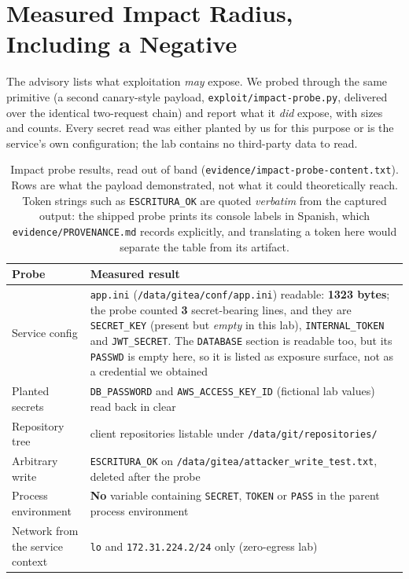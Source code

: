 \documentclass[journal]{IEEEtran}
\begin{document}
\section{Measured Impact Radius, Including a Negative}
\label{sec:impact}

The advisory lists what exploitation \emph{may} expose. We probed through the
same primitive (a second canary-style payload, \texttt{exploit/impact-probe.py},
delivered over the identical two-request chain) and report what it \emph{did}
expose, with sizes and counts. Every secret read was either planted by us for
this purpose or is the service's own configuration; the lab contains no
third-party data to read.

\begin{table}[t]
\centering
\footnotesize
\begin{tabular}{@{}p{2.2cm}p{5.4cm}@{}}
\toprule
Probe & Measured result \\
\midrule
Service config & \texttt{app.ini}
(\texttt{\allowbreak /data/\allowbreak gitea/\allowbreak conf/app.ini}) readable: \textbf{1323 bytes}; the
probe counted \textbf{3} secret-bearing lines, and they are \texttt{SECRET\_KEY}
(present but \emph{empty} in this lab), \texttt{INTERNAL\_TOKEN} and
\texttt{JWT\_SECRET}. The \texttt{DATABASE} section is readable too, but its
\texttt{PASSWD} is empty here, so it is listed as exposure surface, not as a
credential we obtained \\
Planted secrets & \texttt{DB\_PASSWORD} and \texttt{AWS\_ACCESS\_KEY\_ID}
(fictional lab values) read back in clear \\
Repository tree & client repositories listable under
\texttt{/data/git/repositories/} \\
Arbitrary write & \texttt{ESCRITURA\_OK} on
\texttt{\allowbreak /data/\allowbreak gitea/\allowbreak attacker\_write\_\allowbreak test.txt}, deleted after the probe \\
Process environment & \textbf{No} variable containing
\texttt{SECRET}, \texttt{TOKEN} or \texttt{PASS} in the parent process
environment \\
Network from the service context & \texttt{lo} and \texttt{172.31.224.2/24}
only (zero-egress lab) \\
\bottomrule
\end{tabular}
\caption{Impact probe results, read out of band
(\texttt{evidence/impact-probe-content.txt}). Rows are what the payload
demonstrated, not what it could theoretically reach. Token strings such as
\texttt{ESCRITURA\_OK} are quoted \emph{verbatim} from the captured output: the shipped
probe prints its console labels in Spanish, which \texttt{evidence/PROVENANCE.md} records
explicitly, and translating a token here would separate the table from its artifact.}
\label{tab:impact}
\end{table}
\end{document}
